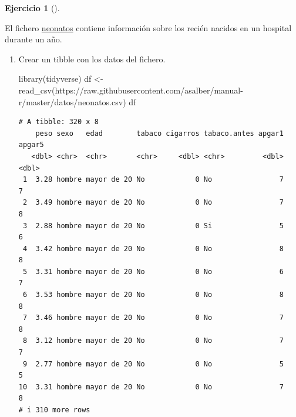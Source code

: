 \documentclass[
  a4paper,
]{scrreport}
\newenvironment{Shaded}{\begin{snugshade}}{\end{snugshade}}
\newcommand{\FunctionTok}[1]{\textcolor[rgb]{0.28,0.35,0.67}{#1}}
\newcommand{\NormalTok}[1]{\textcolor[rgb]{0.00,0.23,0.31}{#1}}
\newcommand{\OtherTok}[1]{\textcolor[rgb]{0.00,0.23,0.31}{#1}}
\newcommand{\StringTok}[1]{\textcolor[rgb]{0.13,0.47,0.30}{#1}}
\theoremstyle{definition}
\newtheorem{exercise}{Ejercicio}[chapter]
\theoremstyle{definition}
\theoremstyle{remark}
\begin{document}
\begin{exercise}[]\protect\hypertarget{exr-graficos-1}{}\label{exr-graficos-1}

El fichero
\href{https://raw.githubusercontent.com/asalber/manual-r/master/datos/neonatos.csv}{neonatos}
contiene información sobre los recién nacidos en un hospital durante un
año.

\begin{enumerate}
\def\labelenumi{\alph{enumi}.}
\item
  Crear un tibble con los datos del fichero.

  \begin{tcolorbox}[enhanced jigsaw, title=\textcolor{quarto-callout-note-color}{\faInfo}\hspace{0.5em}{Solución}, titlerule=0mm, toprule=.15mm, colbacktitle=quarto-callout-note-color!10!white, arc=.35mm, colframe=quarto-callout-note-color-frame, opacitybacktitle=0.6, coltitle=black, left=2mm, colback=white, opacityback=0, breakable, bottomrule=.15mm, toptitle=1mm, leftrule=.75mm, bottomtitle=1mm, rightrule=.15mm]

\begin{Shaded}
\begin{Highlighting}[]
\FunctionTok{library}\NormalTok{(tidyverse)}
\NormalTok{df }\OtherTok{\textless{}{-}} \FunctionTok{read\_csv}\NormalTok{(}\StringTok{\textquotesingle{}https://raw.githubusercontent.com/asalber/manual{-}r/master/datos/neonatos.csv\textquotesingle{}}\NormalTok{)}
\NormalTok{df}
\end{Highlighting}
\end{Shaded}

\begin{verbatim}
# A tibble: 320 x 8
    peso sexo   edad        tabaco cigarros tabaco.antes apgar1 apgar5
   <dbl> <chr>  <chr>       <chr>     <dbl> <chr>         <dbl>  <dbl>
 1  3.28 hombre mayor de 20 No            0 No                7      7
 2  3.49 hombre mayor de 20 No            0 No                7      8
 3  2.88 hombre mayor de 20 No            0 Si                5      6
 4  3.42 hombre mayor de 20 No            0 No                8      8
 5  3.31 hombre mayor de 20 No            0 No                6      7
 6  3.53 hombre mayor de 20 No            0 No                8      8
 7  3.46 hombre mayor de 20 No            0 No                7      8
 8  3.12 hombre mayor de 20 No            0 No                7      7
 9  2.77 hombre mayor de 20 No            0 No                5      5
10  3.31 hombre mayor de 20 No            0 No                7      8
# i 310 more rows
\end{verbatim}


\end{tcolorbox}
\end{enumerate}
\end{exercise}
\end{document}
